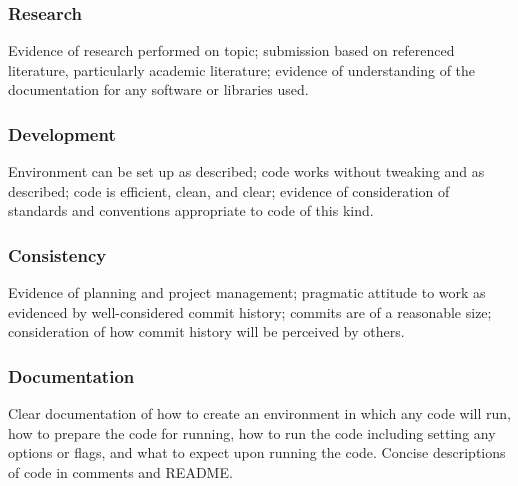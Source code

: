 \documentclass[a4paper, 12pt]{scrartcl}
\begin{document}
    \subsubsection*{Research}
    Evidence of research performed on topic; submission based on referenced literature, particularly academic literature; evidence of understanding of the documentation for any software or libraries used.
    \subsubsection*{Development}
    Environment can be set up as described; code works without tweaking and as described; code is efficient, clean, and clear; evidence of consideration of standards and conventions appropriate to code of this kind.
    \subsubsection*{Consistency}
    Evidence of planning and project management; pragmatic attitude to work as evidenced by well-considered commit history; commits are of a reasonable size; consideration of how commit history will be perceived by others.
    \subsubsection*{Documentation}
    Clear documentation of how to create an environment in which any code will run, how to prepare the code for running, how to run the code including setting any options or flags, and what to expect upon running the code. Concise descriptions of code in comments and README.
    
  
  
  
\end{document}
